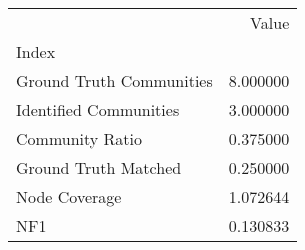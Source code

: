 \begin{tabular}{lr}
\toprule
{} &     Value \\
Index                    &           \\
\midrule
Ground Truth Communities &  8.000000 \\
Identified Communities   &  3.000000 \\
Community Ratio          &  0.375000 \\
Ground Truth Matched     &  0.250000 \\
Node Coverage            &  1.072644 \\
NF1                      &  0.130833 \\
\bottomrule
\end{tabular}
